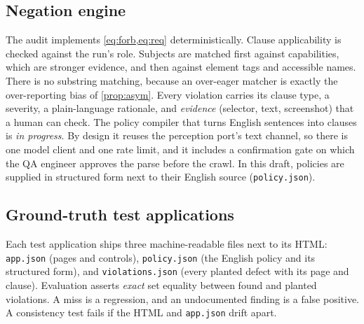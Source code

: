 \subsection{Negation engine}
\label{sec:system:negation}
The audit implements \cref{eq:forb,eq:req} deterministically. Clause
applicability is checked against the run's role. Subjects are matched first
against capabilities, which are stronger evidence, and then against element
tags and accessible names. There is no substring matching, because an
over-eager matcher is exactly the over-reporting bias of \cref{prop:asym}.
Every violation carries its clause type, a severity, a plain-language
rationale, and \emph{evidence} (selector, text, screenshot) that a human can
check. The policy compiler that turns English sentences into clauses is
\emph{in progress}. By design it reuses the perception port's text channel, so
there is one model client and one rate limit, and it includes a confirmation
gate on which the QA engineer approves the parse before the crawl. In this
draft, policies are supplied in structured form next to their English source
(\texttt{policy.json}).

\subsection{Ground-truth test applications}
Each test application ships three machine-readable files next to its HTML:
\texttt{app.json} (pages and controls), \texttt{policy.json} (the English
policy and its structured form), and \texttt{violations.json} (every planted
defect with its page and clause). Evaluation asserts \emph{exact} set equality
between found and planted violations. A miss is a regression, and an
undocumented finding is a false positive. A consistency test fails if the HTML
and \texttt{app.json} drift apart.

